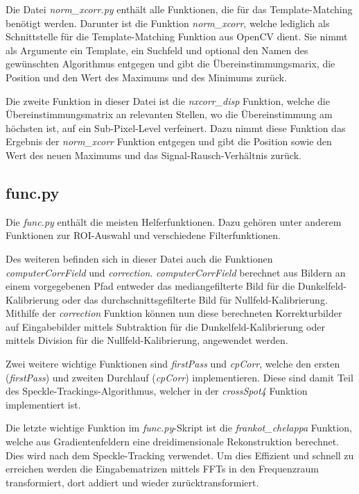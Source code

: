 Die Datei \textit{norm\_xcorr.py} enthält alle Funktionen, die für das Template-Matching benötigt werden. Darunter ist die Funktion \textit{norm\_xcorr}, welche lediglich als Schnittstelle für die Template-Matching Funktion aus OpenCV dient. Sie nimmt als Argumente ein Template, ein Suchfeld und optional den Namen des gewünschten Algorithmus entgegen und gibt die Übereinstimmungsmarix, die Position und den Wert des Maximums und des Minimums zurück.

Die zweite Funktion in dieser Datei ist die \textit{nxcorr\_disp} Funktion, welche die Übereinstimmungsmatrix an relevanten Stellen, wo die Übereinstimmung am höchsten ist, auf ein Sub-Pixel-Level verfeinert. Dazu nimmt diese Funktion das Ergebnis der \textit{norm\_xcorr} Funktion entgegen und gibt die Position sowie den Wert des neuen Maximums und das Signal-Rausch-Verhältnis zurück. 

\subsection{func.py}

Die \textit{func.py} enthält die meisten Helferfunktionen. Dazu gehören unter anderem Funktionen zur \gls{ROI}-Auswahl und verschiedene Filterfunktionen. 

Des weiteren befinden sich in dieser Datei auch die Funktionen \textit{computerCorrField} und \textit{correction}. \textit{computerCorrField} berechnet aus Bildern an einem vorgegebenen Pfad entweder das mediangefilterte Bild für die Dunkelfeld-Kalibrierung oder das durchschnittsgefilterte Bild für Nullfeld-Kalibrierung. Mithilfe der \textit{correction} Funktion können nun diese berechneten Korrekturbilder auf Eingabebilder mittels Subtraktion für die Dunkelfeld-Kalibrierung oder mittels Division für die Nullfeld-Kalibrierung, angewendet werden.

Zwei weitere wichtige Funktionen sind \textit{firstPass} und \textit{cpCorr}, welche den ersten (\textit{firstPass}) und zweiten Durchlauf (\textit{cpCorr}) implementieren. Diese sind damit Teil des Speckle-Trackings-Algorithmus, welcher in der \textit{crossSpot4} Funktion implementiert ist.

Die letzte wichtige Funktion im \textit{func.py}-Skript ist die \textit{frankot\_chelappa} Funktion, welche aus Gradientenfeldern eine dreidimensionale Rekonstruktion berechnet. Dies wird nach dem Speckle-Tracking verwendet. Um dies Effizient und schnell zu erreichen werden die Eingabematrizen mittels \glspl{FFT} in den Frequenzraum transformiert, dort addiert und wieder zurücktransformiert. 

